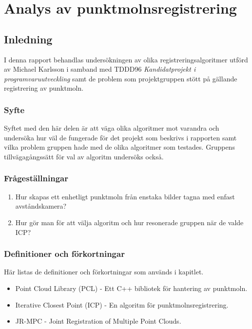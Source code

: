 \chapter{Analys av punktmolnsregistrering}
\label{cha:indiv-report-karlsson}


\section{Inledning}
\label{sec:introduction-karlsson}

I denna rapport behandlas undersökningen av olika registreringsalgoritmer utförd av Michael Karlsson i samband med TDDD96 \textit{Kandidatprojekt i programvaruutveckling} samt de problem som projektgruppen stött på gällande registrering av punktmoln.

\subsection{Syfte}
\label{sec:purpose-karlsson}

Syftet med den här delen är att väga olika algoritmer mot varandra och undersöka hur väl de fungerade för det projekt som beskrivs i rapporten samt vilka problem gruppen hade med de olika algoritmer som testades. Gruppens tillvägagångssätt för val av algoritm undersöks också.


\subsection{Frågeställningar}
\label{sec:issue-karlsson}

\begin{enumerate}
	\item Hur skapas ett enhetligt punktmoln från enstaka bilder tagna med en\newline  fast avståndskamera?
	\item Hur gör man för att välja algoritm och hur resonerade gruppen när de valde ICP?	
\end{enumerate}

\subsection{Definitioner och förkortningar}
\label{sec:definitions-acronyms-karlsson}

Här listas de definitioner och förkortningar som används i kapitlet.

\begin{itemize}
	\item Point Cloud Library (PCL) \cite{pcl_home} - Ett C++ bibliotek för hantering av punktmoln.
	\item Iterative Closest Point (ICP) - En algoritm för punktmolnsregistrering.
	\item JR-MPC \cite{Evangelidis-ECCV-2014} - Joint Registration of Multiple Point Clouds.
\end{itemize}


